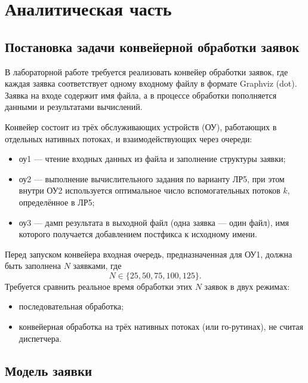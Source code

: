 \chapter{Аналитическая часть}

\section{Постановка задачи конвейерной обработки заявок}

В лабораторной работе требуется реализовать конвейер обработки заявок, где каждая заявка соответствует одному входному файлу в формате Graphviz (dot).
Заявка на входе содержит имя файла, а в процессе обработки пополняется данными и результатами вычислений.

Конвейер состоит из трёх обслуживающих устройств (ОУ), работающих в отдельных нативных потоках, и взаимодействующих через очереди:
\begin{itemize}
	\item оу1 --- чтение входных данных из файла и заполнение структуры заявки;
	\item оу2 --- выполнение вычислительного задания по варианту ЛР5, при этом внутри ОУ2 используется оптимальное число вспомогательных потоков $k$, определённое в ЛР5;
	\item оу3 --- дамп результата в выходной файл (одна заявка --- один файл), имя которого получается добавлением постфикса к исходному имени.
\end{itemize}

Перед запуском конвейера входная очередь, предназначенная для ОУ1, должна быть заполнена $N$ заявками, где
\[
N \in \{25, 50, 75, 100, 125\}.
\]
Требуется сравнить реальное время обработки этих $N$ заявок в двух режимах:
\begin{itemize}
	\item последовательная обработка;
	\item конвейерная обработка на трёх нативных потоках (или го-рутинах), не считая диспетчера.
\end{itemize}

\section{Модель заявки}

